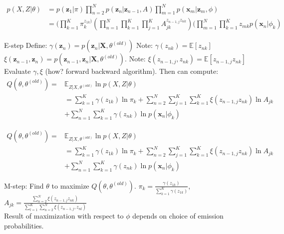 \documentclass[10pt]{beamer}
\begin{document}
\begin{frame}
\begin{equation*}
\begin{split}
p(X, Z | \theta) &= p(\mathbf{z}_1| \pi) \prod_{n=2}^N p(\mathbf{z}_n | \mathbf{z}_{n-1}, A) \prod_{m=1}^N p(\mathbf{x}_m | \mathbf{z}_m, \phi) \\
&=(\prod_{k=1}^{K} \pi_k^{z_{1k} )}(\prod_{n=1}^N\prod_{k=1}^K \prod_{j=1}^K A_{jk}^{z_{n-1,j}z_{nk} })( \prod_{m=1}^N \prod_{k=1}^K z_{mk} p(\mathbf{x}_n | \phi_k)
 \end{split}
 \end{equation*}
\begin{sblock}{E-step}
Define: $\gamma(\mathbf{z}_n)  = p(\mathbf{z}_n | \mathbf{X}, \theta^{(old)})$ Note: $\gamma(z_{nk}) = \mathbb{E}[z_{nk}] $ \\%
$\xi( \mathbf{z}_{n-1}, \mathbf{z}_n) = p(\mathbf{z}_{n-1}, \mathbf{z}_n |  \mathbf{X}, \theta^{(old)}).$ Note: $\xi(z_{n-1, j}, z_{nk} ) = \mathbb{E}[z_{n-1,j}z_{nk}] $\\%
Evaluate $\gamma, \xi$ (how? forward backward algorithm). Then can compute:
\begin{equation*}
\begin{split}
Q(\theta, \theta^{(old)}) =& \mathbb{E}_{Z | X, \theta^{(old)}} \ln p(X, Z | \theta) \\
&= \sum_{k=1}^K \gamma(z_{1k}) \ln \pi_k + \sum_{n=2}^N \sum_{j=1}^K \sum_{k=1}^K \xi(z_{n-1, j} z_{nk}) \ln A_{jk}\\
&+ \sum_{n=1}^N\sum_{k=1}^K \gamma(z_{nk}) \ln p(\mathbf{x}_n | \phi_k)
\end{split}
\end{equation*}
\end{sblock}
\end{frame}


\begin{frame}
\begin{equation*}
\begin{split}
Q(\theta, \theta^{(old)}) =& \mathbb{E}_{Z | X, \theta^{(old)}} \ln p(X, Z | \theta) \\
&= \sum_{k=1}^K \gamma(z_{1k}) \ln \pi_k + \sum_{n=2}^N \sum_{j=1}^K \sum_{k=1}^K \xi(z_{n-1, j} z_{nk}) \ln A_{jk}\\
&+ \sum_{n=1}^N\sum_{k=1}^K \gamma(z_{nk}) \ln p(\mathbf{x}_n | \phi_k)
\end{split}
\end{equation*}
\begin{sblock}{M-step: Find $\theta$ to maximize $Q(\theta, \theta^{(old)})$.}
$\pi_k = \frac{\gamma(z_{1k})}{\sum_{k=1}^K \gamma(z_{1k})}$, $A_{jk} = \frac {\sum_{n=2}^N \xi(z_{n-1, j} z_{nk})}{\sum_{l=1}^K\sum_{n=2}^N \xi(z_{n-1,j},z_{nl})}$ \\
Result of maximization with respect to $\phi$ depends on choice of emission probabilities.
\end{sblock}
\end{frame}
\end{document}
